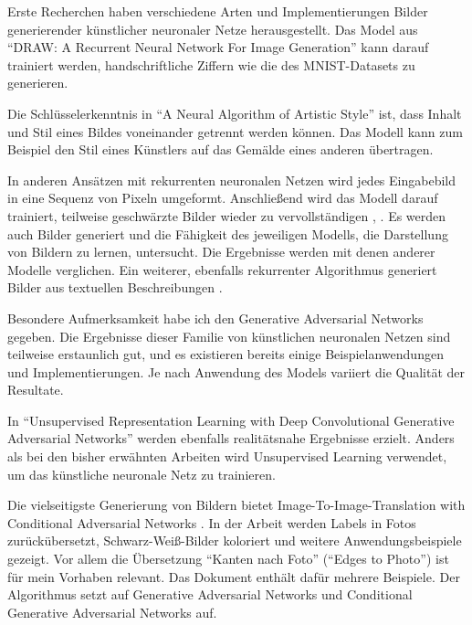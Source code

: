 Erste Recherchen haben verschiedene Arten und Implementierungen Bilder generierender künstlicher neuronaler Netze herausgestellt. Das Model aus ``DRAW: A Recurrent Neural Network For Image Generation'' \cite{gregor2015draw} kann darauf trainiert werden, handschriftliche Ziffern wie die des MNIST-Datasets \cite{deng2012mnist} zu generieren.

Die Schlüsselerkenntnis in ``A Neural Algorithm of Artistic Style'' \cite{gatys2015nst} ist, dass Inhalt und Stil eines Bildes voneinander getrennt werden können. Das Modell kann zum Beispiel den Stil eines Künstlers auf das Gemälde eines anderen übertragen.

In anderen Ansätzen mit rekurrenten neuronalen Netzen wird jedes Eingabebild in eine Sequenz von Pixeln umgeformt. Anschließend wird das Modell darauf trainiert, teilweise geschwärzte Bilder wieder zu vervollständigen \cite{chen2020generative}, \cite{oord2016pixel}. Es werden auch Bilder generiert und die Fähigkeit des jeweiligen Modells, die Darstellung von Bildern zu lernen, untersucht. Die Ergebnisse werden mit denen anderer Modelle verglichen. Ein weiterer, ebenfalls rekurrenter Algorithmus generiert Bilder aus textuellen Beschreibungen \cite{ramesh2021zeroshot}.

Besondere Aufmerksamkeit habe ich den Generative Adversarial Networks \cite{goodfellow2014generative} gegeben. Die Ergebnisse dieser Familie von künstlichen neuronalen Netzen sind teilweise erstaunlich gut, und es existieren bereits einige Beispielanwendungen und Implementierungen. Je nach Anwendung des Models variiert die Qualität der Resultate.

In ``Unsupervised Representation Learning with Deep Convolutional Generative Adversarial Networks'' \cite{radford2016unsupervised} werden ebenfalls
realitätsnahe Ergebnisse erzielt. Anders als bei den bisher erwähnten Arbeiten
wird Unsupervised Learning verwendet, um das künstliche neuronale Netz zu trainieren.

Die vielseitigste Generierung von Bildern bietet Image-To-Image-Translation with Conditional Adversarial Networks \cite{isola2018imagetoimage}. In der Arbeit werden Labels in Fotos zurückübersetzt, Schwarz-Weiß-Bilder koloriert und weitere Anwendungsbeispiele gezeigt. Vor allem die Übersetzung ``Kanten nach Foto'' (``Edges to Photo'') ist für mein Vorhaben relevant. Das Dokument enthält dafür mehrere Beispiele. Der Algorithmus setzt auf Generative Adversarial Networks \cite{goodfellow2014generative} und Conditional Generative Adversarial Networks \cite{mirza2014conditional} auf.

